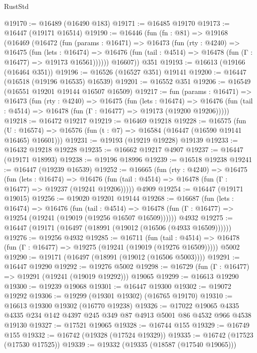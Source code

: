 \begin{lexlean}{RustStd}
\begin{coremodule}
{\begin{coremodule}
{{{{{{{{{{{{{{{{{{{{{{{{{{{{{{{{{{{{{{{{{{{{{{{{{{{{{{{@19170 := @16489 (@16490 @183)
@19171 := @16485 @19170
@19173 := @16447 (@19171 @16514)
@19190 := @16446
    (fun (fn : @81) =>
    @19168
      (@16469
        (@16472
          (fun (params : @16471) =>
          @16473
            (fun (rty : @4240) =>
            @16475
              (fun (lets : @16474) =>
              @16476 (fun (tail : @4514) => @16478 (fun (Γ : @16477) => @19173 @16561))))))
        @16607))
    @351
@19193 := @16613 (@19166 (@16464 @351))
@19196 := @16526 (@16527 @351) @19141
@19200 := @16447 (@16518 (@19196 @16535) @16539)
@19201 := @16552 @351
@19206 := @16549 (@16551 @19201 @19144 @16507 @16509)
@19217 := fun (params : @16471) =>
  @16473
    (fun (rty : @4240) =>
    @16475
      (fun (lets : @16474) =>
      @16476 (fun (tail : @4514) => @16478 (fun (Γ : @16477) => @19173 (@19200 @19206)))))
@19218 := @16472 @19217
@19219 := @16469 @19218
@19228 := @16575
    (fun (U : @16574) => @16576 (fun (t : @7) => @16584 (@16447 (@16590 @19141 @16465) @16601)))
@19231 := @19193 (@19219 @19228) @19139
@19233 := @16432 @19218 @19228
@19235 := @16662 @19217 @4907
@19237 := @16447 (@19171 @18993)
@19238 := @19196 @18996
@19239 := @16518 @19238
@19241 := @16447 (@19239 @16539)
@19252 := @16665
    (fun (rty : @4240) =>
    @16475
      (fun (lets : @16474) =>
      @16476 (fun (tail : @4514) => @16478 (fun (Γ : @16477) => @19237 (@19241 @19206)))))
    @4909
@19254 := @16447 (@19171 @19015)
@19256 := @19020 @19201 @19144
@19268 := @16687
    (fun (lets : @16474) =>
    @16476
      (fun (tail : @4514) =>
      @16478 (fun (Γ : @16477) => @19254 (@19241 (@19019 (@19256 @16507 @16509))))))
    @4932
@19275 := @16447 (@19171 (@16497 (@18991 (@19012 (@16506 (@4933 @16509))))))
@19276 := @19256 @4932
@19285 := @16711
    (fun (tail : @4514) => @16478 (fun (Γ : @16477) => @19275 (@19241 (@19019 (@19276 @16509)))))
    @5002
@19290 := @19171 (@16497 (@18991 (@19012 (@16506 @5003))))
@19291 := @16447 @19290
@19292 := @19276 @5002
@19298 := @16729 (fun (Γ : @16477) => @19291 (@19241 (@19019 @19292))) @19065
@19299 := @16613 @19290
@19300 := @19239 @19068
@19301 := @16447 @19300
@19302 := @19072 @19292
@19306 := @19299 (@19301 @19302) (@16765 @19170)
@19310 := @16613 @19300 @19302 (@16770 @19238)
@19326 := @17022
    @19065
    @4335
    @4335
    @234
    @142
    @4397
    @245
    @349
    @87
    @4913
    @5001
    @86
    @4532
    @966
    @4538
    @19130
@19327 := @17521 @19065
@19328 := @16744 @155
@19329 := @16749 @155
@19332 := @16742 (@19328 (@17524 @19329))
@19335 := @16742 (@17523 (@17530 @17525))
@19339 := @19332 (@19335 (@18587 (@17540 @19065)))
}}}}}}}}}}}}}}}}}}}}}}}}}}}}}}}}}}}}}}}}}}}}}}}}}}}}}}}
\end{coremodule}}
\end{coremodule}
\end{lexlean}
